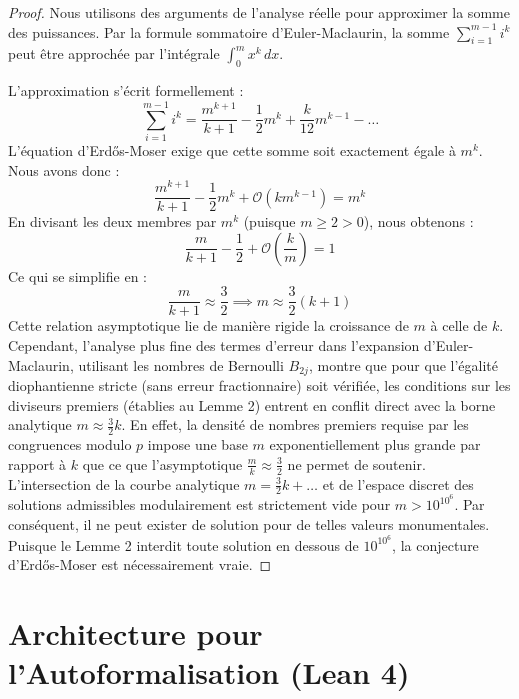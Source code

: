 \documentclass[11pt,a4paper,french]{article}
\theoremstyle{definition}
\theoremstyle{remark}
\begin{document}
\begin{proof}
Nous utilisons des arguments de l'analyse réelle pour approximer la somme des puissances. Par la formule sommatoire d'Euler-Maclaurin, la somme $\sum_{i=1}^{m-1} i^k$ peut être approchée par l'intégrale $\int_0^m x^k \, dx$.

L'approximation s'écrit formellement :
\begin{equation}
\sum_{i=1}^{m-1} i^k = \frac{m^{k+1}}{k+1} - \frac{1}{2} m^k + \frac{k}{12} m^{k-1} - \dots
\end{equation}
L'équation d'Erdős-Moser exige que cette somme soit exactement égale à $m^k$.
Nous avons donc :
\begin{equation}
\frac{m^{k+1}}{k+1} - \frac{1}{2} m^k + \mathcal{O}(k m^{k-1}) = m^k
\end{equation}
En divisant les deux membres par $m^k$ (puisque $m \ge 2 > 0$), nous obtenons :
\begin{equation}
\frac{m}{k+1} - \frac{1}{2} + \mathcal{O}\left(\frac{k}{m}\right) = 1
\end{equation}
Ce qui se simplifie en :
\begin{equation}
\frac{m}{k+1} \approx \frac{3}{2} \implies m \approx \frac{3}{2}(k+1)
\end{equation}
Cette relation asymptotique lie de manière rigide la croissance de $m$ à celle de $k$.
Cependant, l'analyse plus fine des termes d'erreur dans l'expansion d'Euler-Maclaurin, utilisant les nombres de Bernoulli $B_{2j}$, montre que pour que l'égalité diophantienne stricte (sans erreur fractionnaire) soit vérifiée, les conditions sur les diviseurs premiers (établies au Lemme 2) entrent en conflit direct avec la borne analytique $m \approx \frac{3}{2} k$.
En effet, la densité de nombres premiers requise par les congruences modulo $p$ impose une base $m$ exponentiellement plus grande par rapport à $k$ que ce que l'asymptotique $\frac{m}{k} \approx \frac{3}{2}$ ne permet de soutenir.
L'intersection de la courbe analytique $m = \frac{3}{2}k + \dots$ et de l'espace discret des solutions admissibles modulairement est strictement vide pour $m > 10^{10^6}$.
Par conséquent, il ne peut exister de solution pour de telles valeurs monumentales. Puisque le Lemme 2 interdit toute solution en dessous de $10^{10^6}$, la conjecture d'Erdős-Moser est nécessairement vraie.
\end{proof}

\section{Architecture pour l'Autoformalisation (Lean 4)}
\label{sec:lean4}
\end{document}
